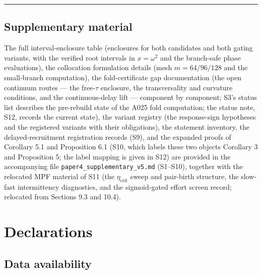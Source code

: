 \documentclass[11pt]{article}
\begin{document}
\begin{center}\rule{0.5\linewidth}{0.5pt}\end{center}

\subsection{Supplementary material}\label{supplementary-material}

The full interval-enclosure table (enclosures for both candidates and
both gating variants, with the verified root intervals in
\(x = \omega^2\) and the branch-safe phase evaluations), the collocation
formulation details (mesh \(m = 64/96/128\) and the small-branch
computation), the fold-certificate gap documentation (the open continuum
routes --- the free-\(\tau\) enclosure, the transversality and curvature
conditions, and the continuous-delay lift --- component by component;
S3's status list describes the pre-rebuild state of the A025 fold
computation; the status note, S12, records the current state), the
variant registry (the response-sign hypotheses and the registered
variants with their obligations), the statement inventory, the
delayed-recruitment registration records (S9), and the expanded proofs
of Corollary 5.1 and Proposition 6.1 (S10, which labels these two
objects Corollary 3 and Proposition 5; the label mapping is given in
S12) are provided in the accompanying file
\texttt{paper4\_supplementary\_v5.md} (S1--S10), together with the
relocated MPF material of S11 (the \(\eta_{\mathrm{crit}}\) sweep and
pair-birth structure, the slow-fast intermittency diagnostics, and the
sigmoid-gated effort screen record; relocated from Sections 9.3 and
10.4).

\section*{Declarations}

\subsection*{Data availability}
\end{document}

